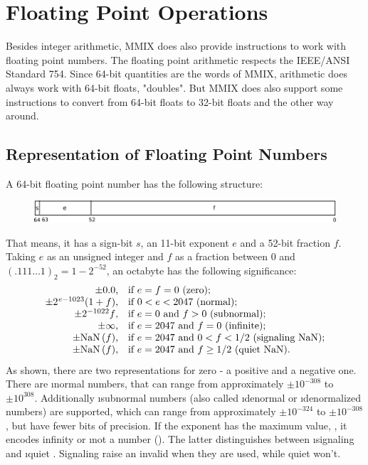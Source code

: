 \section{Floating Point Operations}

Besides integer arithmetic, MMIX does also provide instructions to work with floating point numbers. The floating point arithmetic respects the IEEE/ANSI Standard 754. Since 64-bit quantities are the words of MMIX, arithmetic does always work with 64-bit floats, \ie "doubles". But MMIX does also support some instructions to convert from 64-bit floats to 32-bit floats and the other way around.

\subsection{Representation of Floating Point Numbers}

A 64-bit floating point number has the following structure:
\begin{figure}[H]
	\centering
	\includegraphics[width=\textwidth]{img/float-crop.pdf}
\end{figure}
\vspace{-20pt}
\noindent That means, it has a sign-bit $s$, an 11-bit exponent $e$ and a 52-bit fraction $f$. Taking $e$ as an unsigned integer and $f$ as a fraction between 0 and $(.111\dots1)_2 = 1 - 2^{-52}$, an octabyte has the following significance:
$$\vbox{\halign{\hfil$\pm#$,\quad if &#\hfil\cr
	0.0								& $e = f = 0$ (zero);\cr
	2^{\mkern1mu e - 1023}(1 + f)	& $0 < e < 2047$ (normal);\cr
	2^{-1022}f						& $e = 0$ and $f > 0$ (subnormal);\cr
	\infty							& $e = 2047$ and $f = 0$ (infinite);\cr
	\NaN(f)							& $e = 2047$ and $0 < f < 1/2$ (signaling NaN);\cr
	\NaN(f)							& $e = 2047$ and $f \ge 1/2$ (quiet NaN).\cr
}}$$
As shown, there are two representations for zero - a positive and a negative one. There are \i{normal} numbers, that can range from approximately $\pm 10^{-308}$ to $\pm 10^{308}$. Additionally \i{subnormal} numbers (also called \i{denormal} or \i{denormalized} numbers) are supported, which can range from approximately $\pm 10^{-324}$ to $\pm 10^{-308}$, but have fewer bits of precision. If the exponent has the maximum value, , it encodes infinity or \i{not a number} (\NaN). The latter distinguishes between \i{signaling} and \i{quiet} \NaN. Signaling \NaNs raise an invalid  when they are used, while quiet \NaNs won't. \citep[pg. 15]{mmix-doc}

